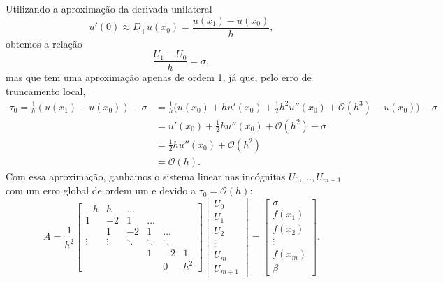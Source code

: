 \documentclass[../differential_methods.tex]{subfiles}
\begin{document}
Utilizando a aproximação da derivada unilateral
\[
	u'(0)\approx D_{+}u(x_{0}) = \frac{u(x_1)-u(x_{0})}{h},
\]
obtemos a relação
\[
	\frac{U_1-U_0}{h} = \sigma ,
\]
mas que tem uma aproximação apenas de ordem 1, já que, pelo erro de truncamento local,
\begin{align*}
	\tau_{0} = \frac{1}{h}(u(x_1)-u(x_{0}))-\sigma & = \frac{1}{h}\biggl(u(x_{0})+hu'(x_{0})+\frac{1}{2}h^{2}u''(x_{0}) + \mathcal{O}(h^{3})-u(x_{0})\biggr)-\sigma \\
	                                               & = u'(x_{0})+\frac{1}{2}hu''(x_{0})+\mathcal{O}(h^{2})-\sigma                                                   \\
	                                               & = \frac{1}{2}hu''(x_{0}) + \mathcal{O}(h^{2})                                                                  \\
	                                               & = \mathcal{O}(h).
\end{align*}
Com essa aproximação, ganhamos o sistema linear nas incógnitas \(U_{0}, \dotsc , U_{m+1}\) com um erro global de ordem um e devido a \(\tau_{0}=\mathcal{O}(h)\):
\[
	A = \frac{1}{h^{2}}\begin{bmatrix}
		-h     & h      & \dotsc &        &        &       \\
		1      & -2     & 1      & \dotsc &        &       \\
		       & 1      & -2     & 1      & \dotsc &       \\
		\vdots & \vdots & \ddots & \ddots & \ddots &       \\
		       &        &        & 1      & -2     & 1     \\
		       &        &        &        & 0      & h^{2}
	\end{bmatrix} \begin{bmatrix}
		U_{0}  \\
		U_{1}  \\
		U_{2}  \\
		\vdots \\
		U_{m}  \\
		U_{m+1}
	\end{bmatrix} = \begin{bmatrix}
		\sigma   \\
		f(x_1)   \\
		f(x_2)   \\
		\vdots   \\
		f(x_{m}) \\
		\beta
	\end{bmatrix}.
\]
\end{document}
